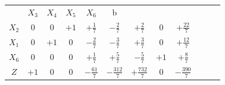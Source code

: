 \begin{frame}
{\begin{table}
\begin{tabular}{c c c c c c c c c c c c}
				&\cellcolor{blue!100} \color{white}   $\scriptstyle X_3$ 
				&\cellcolor{blue!100} \color{white} $\scriptstyle X_4$ 
				&\cellcolor{blue!100} \color{white}   $\scriptstyle X_5$ 
				&\cellcolor{blue!100} \color{red}   $\scriptstyle X_6$ 
				&\cellcolor{blue!100} \color{white} \scriptsize b \\
				\cellcolor{blue!100} \color{red} $\scriptstyle X_2$
				& \cellcolor{yellow!50} $\scriptstyle 0$
				& \cellcolor{yellow!50} $\scriptstyle 0$
				& \cellcolor{yellow!50} $\scriptstyle +1$
				& \cellcolor{yellow!50} $\scriptstyle +\frac{1}{7}$
				& \cellcolor{yellow!50} $\scriptstyle -\frac{2}{7}$
				& \cellcolor{yellow!50} $\scriptstyle +\frac{2}{7}$
				& \cellcolor{yellow!50} $\scriptstyle 0$
				& \cellcolor{yellow!50} $\scriptstyle +\frac{22}{7}$ \\
			    \cellcolor{blue!100} \color{red} $\scriptstyle X_1$
				& \cellcolor{yellow!50} $\scriptstyle 0$
				& \cellcolor{yellow!50} $\scriptstyle +1$
				& \cellcolor{yellow!50} $\scriptstyle 0$
				& \cellcolor{yellow!50} $\scriptstyle -\frac{2}{7}$			
				& \cellcolor{yellow!50} $\scriptstyle -\frac{3}{7}$
				& \cellcolor{yellow!50} $\scriptstyle +\frac{3}{7}$
				& \cellcolor{yellow!50} $\scriptstyle 0$ 
				& \cellcolor{yellow!50} $\scriptstyle +\frac{12}{7}$  \\
				\cellcolor{blue!100} \color{red} $\scriptstyle X_6$
				& \cellcolor{yellow!50} $\scriptstyle 0$
				& \cellcolor{yellow!50} $\scriptstyle 0$
				& \cellcolor{yellow!50} $\scriptstyle 0$
				& \cellcolor{yellow!50} $\scriptstyle +\frac{1}{7}$
				& \cellcolor{yellow!50} $\scriptstyle +\frac{5}{7}$
				& \cellcolor{yellow!50} $\scriptstyle -\frac{5}{7}$
				& \cellcolor{yellow!50} $\scriptstyle +1$
				& \cellcolor{yellow!50} $\scriptstyle +\frac{8}{7}$ \\
				\cellcolor{blue!100} \color{white} $\scriptstyle Z$
				& \cellcolor{yellow!50} $\scriptstyle +1$
				& \cellcolor{yellow!50} $\scriptstyle 0$
				& \cellcolor{yellow!50} $\scriptstyle 0$
				& \cellcolor{yellow!50} $\scriptstyle -\frac{61}{7}$
				& \cellcolor{yellow!50} $\scriptstyle -\frac{312}{7}$
				& \cellcolor{yellow!50} $\scriptstyle +\frac{732}{7}$
				& \cellcolor{yellow!50} $\scriptstyle 0$ 
				& \cellcolor{yellow!50} $\scriptstyle -\frac{390}{7}$  \\
			\end{tabular}
		\end{table}			
	}
	{
		\begin{table}		
			\begin{tabular}{c c c c c c c c c c c c}

\end{tabular}
\end{table}}
\end{frame}
